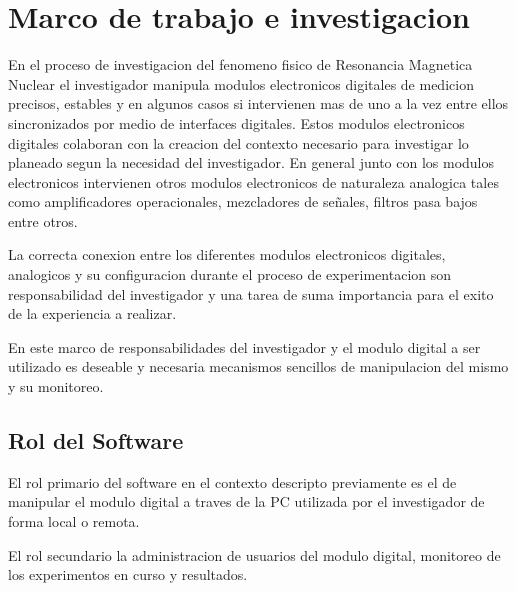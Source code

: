 \section{Marco de trabajo e investigacion}

En el proceso de investigacion del fenomeno fisico de Resonancia Magnetica Nuclear el investigador manipula modulos 
electronicos digitales de medicion precisos, estables y en algunos casos si intervienen mas de uno a la vez entre ellos sincronizados 
por medio de interfaces digitales. Estos modulos electronicos digitales colaboran con la creacion del contexto necesario para investigar lo planeado 
segun la necesidad del investigador. En general junto con los modulos electronicos intervienen otros modulos electronicos de naturaleza analogica
tales como amplificadores operacionales, mezcladores de señales, filtros pasa bajos entre otros.

La correcta conexion entre los diferentes modulos electronicos digitales, analogicos y su configuracion durante el proceso de experimentacion
son responsabilidad del investigador y una tarea de suma importancia para el exito de la experiencia a realizar.

En este marco de responsabilidades del investigador y el modulo digital a ser utilizado es deseable y necesaria mecanismos sencillos de manipulacion
del mismo y su monitoreo.

\subsection{Rol del Software}

El rol primario del software en el contexto descripto previamente es el de manipular el modulo digital a traves de la PC utilizada por el investigador 
de forma local o remota.

El rol secundario la administracion de usuarios del modulo digital, monitoreo de los experimentos en curso y resultados.

